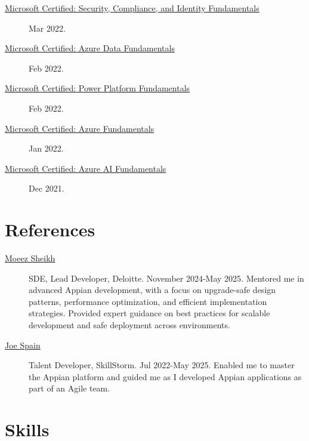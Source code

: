 \documentclass{article}
\begin{document}
\begin{description}
  \item [\href{https://learn.microsoft.com/api/credentials/share/en-us/AlexKoikCestone-7541/DF45C662407C41C5?sharingId=DCF7D068E6ED12E6}{Microsoft Certified: Security, Compliance, and Identity Fundamentals}] Mar 2022.
  \item [\href{https://learn.microsoft.com/api/credentials/share/en-us/AlexKoikCestone-7541/37294D69297F1741?sharingId=DCF7D068E6ED12E6}{Microsoft Certified: Azure Data Fundamentals}] Feb 2022.
  \item [\href{https://learn.microsoft.com/api/credentials/share/en-us/AlexKoikCestone-7541/CE492D7BE04E2F0D?sharingId=DCF7D068E6ED12E6}{Microsoft Certified: Power Platform Fundamentals}] Feb 2022.
  \item [\href{https://learn.microsoft.com/api/credentials/share/en-us/AlexKoikCestone-7541/51E3A61AEA2E3998?sharingId=DCF7D068E6ED12E6}{Microsoft Certified: Azure Fundamentals}] Jan 2022.
  \item [\href{https://learn.microsoft.com/api/credentials/share/en-us/AlexKoikCestone-7541/32EE850D92B0C609?sharingId=DCF7D068E6ED12E6}{Microsoft Certified: Azure AI Fundamentals}] Dec 2021.
\end{description}

\vspace{-1em}
\section*{References}\vspace{-0.5em}
\begin{description}
  \item [\href{https://www.linkedin.com/in/moeezsheikh/}{Moeez Sheikh}] SDE, Lead Developer, Deloitte. November 2024-May 2025. Mentored me in advanced Appian development, with a focus on upgrade-safe design patterns, performance optimization, and efficient implementation strategies. Provided expert guidance on best practices for scalable development and safe deployment across environments. 
  \item [\href{https://www.linkedin.com/in/joespain/}{Joe Spain}] Talent Developer, SkillStorm. Jul 2022-May 2025. Enabled me to master the Appian platform and guided me as I developed Appian applications as part of an Agile team.
\end{description}

\vspace{-1em}
\section*{Skills}\vspace{-0.5em}
\end{document}
